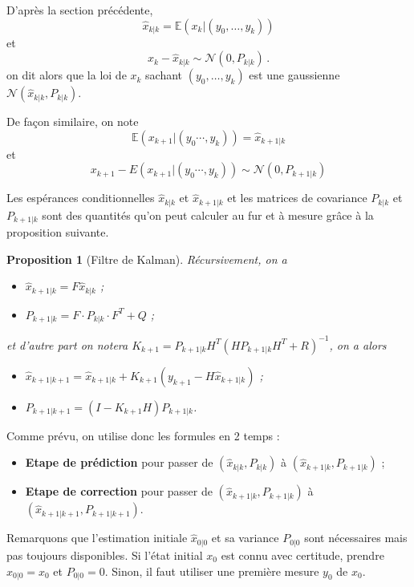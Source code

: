 \documentclass[a4paper,12pt]{book}
\newtheorem{propfr}[thmfr]{Proposition}
\newcommand{\E}{\mathbb{E}}
\begin{document}
D'après la section précédente,
\[
\hat{x}_{k|k}= \E\left(x_k\lvert (y_0,\ldots,y_k)\right)
\]
et
\[
x_k-\hat{x}_{k|k}\sim \mathcal{N}\left( 0, P_{k| k}\right)\,.\]
on dit alors que la loi de $x_{k}$ sachant $(y_0,\ldots,y_k)$ est une gaussienne $\mathcal{N}(\hat{x}_{k|k},P_{k|k})$.

De façon similaire,  on note
\[\E(x_{k+1}|(y_0\cdots, y_k)) =\hat{x}_{k+1|k}\]
et \[x_{k+1}-E(x_{k+1}|(y_0\cdots, y_k))\sim\mathcal{N}(0,P_{k+1|k})\]

Les espérances conditionnelles $\hat{x}_{k|k}$ et $\hat{x}_{k+1|k}$ et les matrices de covariance $P_{k|k}$ et $P_{k+1|k}$ sont des quantités qu'on peut calculer au fur et à mesure grâce à la proposition suivante.

\begin{propfr}[Filtre de Kalman]
Récursivement, on a
\begin{itemize}
\item $\hat{x}_{k+1|k}=F\hat{x}_{k|k}$ ;
\item $P_{k+1|k}=F \cdot P_{k|k}\cdot F^T+Q$ ;
\end{itemize}
et d'autre part on notera $K_{k+1}=P_{k+1|k}H^T(HP_{k+1|k} H^T+R)^{-1}$, on a alors
\begin{itemize}
\item $\hat{x}_{k+1|k+1}=\hat{x}_{k+1|k}+K_{k+1}(y_{k+1}-H\hat{x}_{k+1|k})$ ;
\item $P_{k+1|k+1}=(I-K_{k+1}H)P_{k+1|k}$.
\end{itemize}
\end{propfr}


Comme prévu, on utilise donc les formules en 2 temps :\begin{itemize}
\item \textbf{Etape de prédiction} pour passer de $(\hat{x}_{k|k},P_{k|k})$ à $(\hat{x}_{k+1|k},P_{k+1|k})$ ;
\item \textbf{Etape de correction} pour passer de $(\hat{x}_{k+1|k},P_{k+1|k})$ à $(\hat{x}_{k+1|k+1},P_{k+1|k+1})$.
\end{itemize}
\medskip

Remarquons que l'estimation initiale $\hat{x}_{0|0}$ et sa variance  $P_{0|0}$ sont nécessaires mais pas toujours disponibles. Si l'état initial $x_0$ est connu avec certitude, prendre $\hat{x}_{0|0}=x_0$ et  $P_{0|0}=0$. Sinon, il faut utiliser une première mesure $y_0$ de $x_0$.
\end{document}
